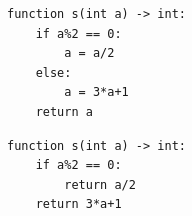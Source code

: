 \documentclass[10pt,a4paper]{article}
\begin{document}
\newbox\ifm
\begin{lrbox}{\ifm}
	\begin{minipage}[t]{.322\textwidth}
\begin{lstlisting}[language=Whiley]
function s(int a) -> int:
    if a%2 == 0:
        a = a/2
    else:
        a = 3*a+1
    return a
\end{lstlisting}
	\end{minipage}
\end{lrbox}
\newbox\ifn
\begin{lrbox}{\ifn}
\begin{minipage}[t]{.322\textwidth}
\begin{lstlisting}[language=Whiley,showlines=true]
function s(int a) -> int:
    if a%2 == 0:
        return a/2
    return 3*a+1
    
    
\end{lstlisting}
\end{minipage}
\end{lrbox}
\end{document}
